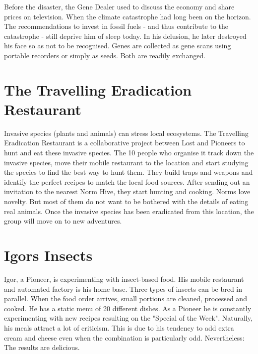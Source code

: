 Before the disaster, the Gene Dealer used to discuss the economy and share prices on television. When the climate catastrophe had long been on the horizon. The recommendations to invest in fossil fuels - and thus contribute to the catastrophe - still deprive him of sleep today. In his delusion, he later destroyed his face so as not to be recognised.
Genes are collected as gene scans using portable recorders or simply as seeds. Both are readily exchanged.

\section{The Travelling Eradication Restaurant}
\label{sec:Eradication Restaurant}

Invasive species (plants and animals) can stress local ecosystems. The Travelling Eradication Restaurant is a collaborative project between Lost and Pioneers to hunt and eat these invasive species.
The 10 people who organise it track down the invasive species, move their mobile restaurant to the location and start studying the species to find the best way to hunt them. They build traps and weapons and identify the perfect recipes to match the local food sources.
After sending out an invitation to the nearest Norm Hive, they start hunting and cooking.
Norms love novelty. But most of them do not want to be bothered with the details of eating real animals.
Once the invasive species has been eradicated from this location, the group will move on to new adventures.

\section{Igors Insects}
\label{sec:Igors Insects}

Igor, a Pioneer, is experimenting with insect-based food. His mobile restaurant and automated factory is his home base. Three types of insects can be bred in parallel. When the food order arrives, small portions are cleaned, processed and cooked.
He has a static menu of 20 different dishes. As a Pioneer he is constantly experimenting with new recipes resulting on the "Special of the Week".
Naturally, his meals attract a lot of criticism. This is due to his tendency to add extra cream and cheese even when the combination is particularly odd. Nevertheless: The results are delicious.